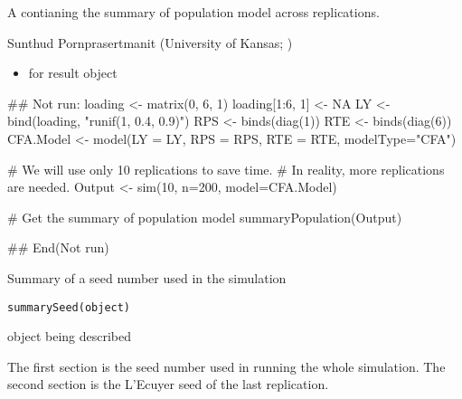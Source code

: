 \documentclass[a4paper]{book}
\begin{document}
%
\begin{Value}
A  contianing the summary of population model across replications.
\end{Value}
%
\begin{Author}\relax
Sunthud Pornprasertmanit (University of Kansas; )
\end{Author}
%
\begin{SeeAlso}\relax
\begin{itemize}

\item {} for result object

\end{itemize}

\end{SeeAlso}
%
\begin{Examples}
\begin{ExampleCode}
## Not run: 
loading <- matrix(0, 6, 1)
loading[1:6, 1] <- NA
LY <- bind(loading, "runif(1, 0.4, 0.9)")
RPS <- binds(diag(1))
RTE <- binds(diag(6))
CFA.Model <- model(LY = LY, RPS = RPS, RTE = RTE, modelType="CFA")

# We will use only 10 replications to save time.
# In reality, more replications are needed.
Output <- sim(10, n=200, model=CFA.Model)

# Get the summary of population model
summaryPopulation(Output)

## End(Not run)
\end{ExampleCode}
\end{Examples}
%
\begin{Description}\relax
Summary of a seed number used in the simulation
\end{Description}
%
\begin{Usage}
\begin{verbatim}
summarySeed(object)
\end{verbatim}
\end{Usage}
%
\begin{Arguments}
\begin{ldescription}
\item[\code{object}] 
 object being described

\end{ldescription}
\end{Arguments}
%
\begin{Value}
The first section is the seed number used in running the whole simulation. The second section is the L'Ecuyer seed of the last replication.
\end{Value}
\end{document}
